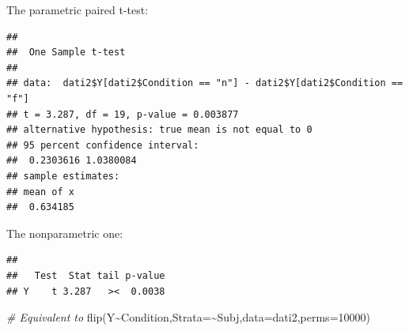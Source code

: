 \documentclass[
]{article}
\newenvironment{Shaded}{\begin{snugshade}}{\end{snugshade}}
\newcommand{\AttributeTok}[1]{\textcolor[rgb]{0.77,0.63,0.00}{#1}}
\newcommand{\CommentTok}[1]{\textcolor[rgb]{0.56,0.35,0.01}{\textit{#1}}}
\newcommand{\DecValTok}[1]{\textcolor[rgb]{0.00,0.00,0.81}{#1}}
\newcommand{\FunctionTok}[1]{\textcolor[rgb]{0.00,0.00,0.00}{#1}}
\newcommand{\NormalTok}[1]{#1}
\newcommand{\SpecialCharTok}[1]{\textcolor[rgb]{0.00,0.00,0.00}{#1}}
\newcommand{\StringTok}[1]{\textcolor[rgb]{0.31,0.60,0.02}{#1}}
\begin{document}
The parametric paired t-test:

\begin{Shaded}
\end{Shaded}

\begin{verbatim}
## 
##  One Sample t-test
## 
## data:  dati2$Y[dati2$Condition == "n"] - dati2$Y[dati2$Condition == "f"]
## t = 3.287, df = 19, p-value = 0.003877
## alternative hypothesis: true mean is not equal to 0
## 95 percent confidence interval:
##  0.2303616 1.0380084
## sample estimates:
## mean of x 
##  0.634185
\end{verbatim}

The nonparametric one:

\begin{Shaded}
\end{Shaded}

\begin{verbatim}
## 
##   Test  Stat tail p-value
## Y    t 3.287   ><  0.0038
\end{verbatim}

\begin{Shaded}
\begin{Highlighting}[]
\CommentTok{\# Equivalent to}
\FunctionTok{flip}\NormalTok{(Y}\SpecialCharTok{\textasciitilde{}}\NormalTok{Condition,}\AttributeTok{Strata=}\SpecialCharTok{\textasciitilde{}}\NormalTok{Subj,}\AttributeTok{data=}\NormalTok{dati2,}\AttributeTok{perms=}\DecValTok{10000}\NormalTok{)}
\end{Highlighting}
\end{Shaded}
\end{document}
